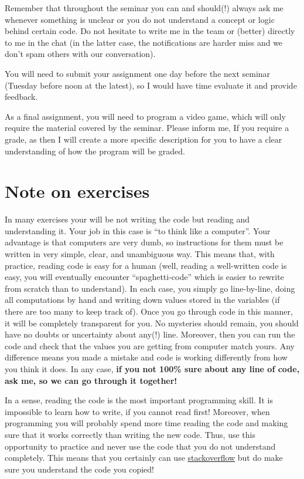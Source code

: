 \documentclass[
]{book}
\begin{document}
Remember that throughout the seminar you can and should(!) always ask me whenever something is unclear or you do not understand a concept or logic behind certain code. Do not hesitate to write me in the team or (better) directly to me in the chat (in the latter case, the notifications are harder miss and we don't spam others with our conversation).

You will need to submit your assignment one day before the next seminar (Tuesday before noon at the latest), so I would have time evaluate it and provide feedback.

As a final assignment, you will need to program a video game, which will only require the material covered by the seminar. Please inform me, If you require a grade, as then I will create a more specific description for you to have a clear understanding of how the program will be graded.

\hypertarget{note-on-exercises}{%
\section*{Note on exercises}\label{note-on-exercises}}

In many exercises your will be not writing the code but reading and understanding it. Your job in this case is ``to think like a computer''. Your advantage is that computers are very dumb, so instructions for them must be written in very simple, clear, and unambiguous way. This means that, with practice, reading code is easy for a human (well, reading a well-written code is easy, you will eventually encounter ``spaghetti-code'' which is easier to rewrite from scratch than to understand). In each case, you simply go line-by-line, doing all computations by hand and writing down values stored in the variables (if there are too many to keep track of). Once you go through code in this manner, it will be completely transparent for you. No mysteries should remain, you should have no doubts or uncertainty about any(!) line. Moreover, then you can run the code and check that the values you are getting from computer match yours. Any difference means you made a mistake and code is working differently from how you think it does. In any case, \textbf{if you not 100\% sure about any line of code, ask me, so we can go through it together!}

In a sense, reading the code is the most important programming skill. It is impossible to learn how to write, if you cannot read first! Moreover, when programming you will probably spend more time reading the code and making sure that it works correctly than writing the new code. Thus, use this opportunity to practice and never use the code that you do not understand completely. This means that you certainly can use \href{https://stackoverflow.com/}{stackoverflow} but do make sure you understand the code you copied!
\end{document}

